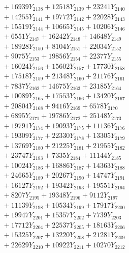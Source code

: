 \documentclass[a4paper,10pt]{article}
\begin{document}
{\begin{align}
&\;  + 16939 Y_{2138} + 12518 Y_{2139} + 23241 Y_{2140} \\[0.3ex]
&\;  + 14255 Y_{2141} + 19772 Y_{2142} + 22028 Y_{2143} \\[0.3ex]
&\;  + 15519 Y_{2144} + 10665 Y_{2145} + 10206 Y_{2146} \\[0.3ex]
&\;  + 6551 Y_{2147} + 16242 Y_{2148} + 14648 Y_{2149} \\[0.3ex]
&\;  + 18928 Y_{2150} + 8104 Y_{2151} + 22034 Y_{2152} \\[0.3ex]
&\;  + 9075 Y_{2153} + 19856 Y_{2154} + 22377 Y_{2155} \\[0.3ex]
&\;  + 16024 Y_{2156} + 15602 Y_{2157} + 17730 Y_{2158} \\[0.5ex]\allowbreak
&\;  + 17518 Y_{2159} + 21348 Y_{2160} + 21176 Y_{2161} \\[0.3ex]
&\;  + 7837 Y_{2162} + 14675 Y_{2163} + 23185 Y_{2164} \\[0.3ex]
&\;  + 10089 Y_{2165} + 17553 Y_{2166} + 13420 Y_{2167} \\[0.3ex]
&\;  + 20804 Y_{2168} + 9416 Y_{2169} + 6578 Y_{2170} \\[0.3ex]
&\;  + 6895 Y_{2171} + 19786 Y_{2172} + 25148 Y_{2173} \\[0.3ex]
&\;  + 19791 Y_{2174} + 19093 Y_{2175} + 11136 Y_{2176} \\[0.3ex]
&\;  + 19309 Y_{2177} + 22330 Y_{2178} + 13305 Y_{2179} \\[0.3ex]
&\;  + 13769 Y_{2180} + 21225 Y_{2181} + 21955 Y_{2182} \\[0.3ex]
&\;  + 23747 Y_{2183} + 7335 Y_{2184} + 11144 Y_{2185} \\[0.3ex]
&\;  + 10024 Y_{2186} + 16886 Y_{2187} + 14363 Y_{2188} \\[0.5ex]\allowbreak
&\;  + 24665 Y_{2189} + 20267 Y_{2190} + 14747 Y_{2191} \\[0.3ex]
&\;  + 16127 Y_{2192} + 19342 Y_{2193} + 19551 Y_{2194} \\[0.3ex]
&\;  + 8207 Y_{2195} + 19348 Y_{2196} + 9112 Y_{2197} \\[0.3ex]
&\;  + 11139 Y_{2198} + 10534 Y_{2199} + 17917 Y_{2200} \\[0.3ex]
&\;  + 19947 Y_{2201} + 15357 Y_{2202} + 7739 Y_{2203} \\[0.3ex]
&\;  + 17712 Y_{2204} + 22537 Y_{2205} + 18163 Y_{2206} \\[0.3ex]
&\;  + 15325 Y_{2207} + 13220 Y_{2208} + 21281 Y_{2209} \\[0.3ex]
&\;  + 22629 Y_{2210} + 10922 Y_{2211} + 10270 Y_{2212} \\[0.3ex]

\end{align}}
\end{document}

